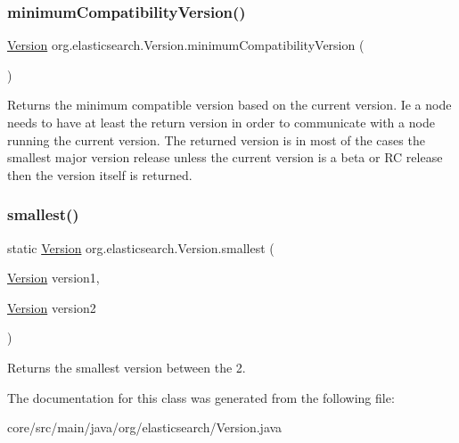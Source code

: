 \subsubsection{\texorpdfstring{minimum\+Compatibility\+Version()}{minimumCompatibilityVersion()}}
{\footnotesize\ttfamily \hyperlink{classorg_1_1elasticsearch_1_1_version}{Version} org.\+elasticsearch.\+Version.\+minimum\+Compatibility\+Version (\begin{DoxyParamCaption}{ }\end{DoxyParamCaption})}

Returns the minimum compatible version based on the current version. Ie a node needs to have at least the return version in order to communicate with a node running the current version. The returned version is in most of the cases the smallest major version release unless the current version is a beta or RC release then the version itself is returned. \hypertarget{classorg_1_1elasticsearch_1_1_version_ab8ee3b9ccaaccbf4980b74541a5f7681}{}\label{classorg_1_1elasticsearch_1_1_version_ab8ee3b9ccaaccbf4980b74541a5f7681} 
\subsubsection{\texorpdfstring{smallest()}{smallest()}}
{\footnotesize\ttfamily static \hyperlink{classorg_1_1elasticsearch_1_1_version}{Version} org.\+elasticsearch.\+Version.\+smallest (\begin{DoxyParamCaption}\item[{\hyperlink{classorg_1_1elasticsearch_1_1_version}{Version}}]{version1,  }\item[{\hyperlink{classorg_1_1elasticsearch_1_1_version}{Version}}]{version2 }\end{DoxyParamCaption})\hspace{0.3cm}{\ttfamily [static]}}

Returns the smallest version between the 2. 

The documentation for this class was generated from the following file\+:\begin{DoxyCompactItemize}
\item 
core/src/main/java/org/elasticsearch/Version.\+java\end{DoxyCompactItemize}
